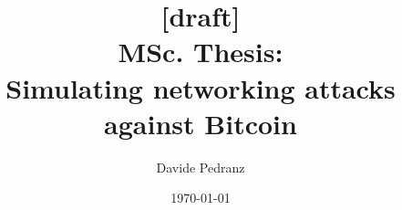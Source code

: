 \documentclass[11pt, a4paper]{report}
\title{[draft]\\MSc. Thesis:\\Simulating networking attacks against Bitcoin}
\author{Davide Pedranz}
\date{\today}
\begin{document}
\begin{titlepage}
	\maketitle
\end{titlepage}

\tableofcontents





\printbibliography
\end{document}
